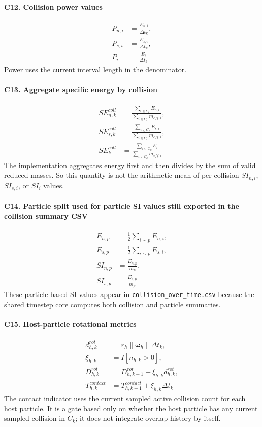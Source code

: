 \documentclass[11pt,a4paper]{article}
\newcommand{\code}[1]{\begingroup\urlstyle{tt}\footnotesize\nolinkurl{#1}\endgroup}
\begin{document}
\paragraph{C12. Collision power values}
\[
\begin{aligned}
P_{n,i} &= \frac{E_{n,i}}{\Delta t_k}, \\
P_{s,i} &= \frac{E_{s,i}}{\Delta t_k}, \\
P_i &= \frac{E_i}{\Delta t_k}
\end{aligned}
\]
Power uses the current interval length in the denominator.

\paragraph{C13. Aggregate specific energy by collision}
\[
\begin{aligned}
SE_{n,k}^{coll} &= \frac{\sum_{i \in C_k} E_{n,i}}{\sum_{i \in C_k} m_{eff,i}}, \\
SE_{s,k}^{coll} &= \frac{\sum_{i \in C_k} E_{s,i}}{\sum_{i \in C_k} m_{eff,i}}, \\
SE_k^{coll} &= \frac{\sum_{i \in C_k} E_i}{\sum_{i \in C_k} m_{eff,i}}
\end{aligned}
\]
The implementation aggregates energy first and then divides by the sum of valid reduced masses.
So this quantity is not the arithmetic mean of per-collision $SI_{n,i}$, $SI_{s,i}$, or $SI_i$ values.

\paragraph{C14. Particle split used for particle SI values still exported in the collision summary CSV}
\[
\begin{aligned}
E_{n,p} &= \frac{1}{2}\sum_{i \sim p} E_{n,i}, \\
E_{s,p} &= \frac{1}{2}\sum_{i \sim p} E_{s,i}, \\
SI_{n,p} &= \frac{E_{n,p}}{m_p}, \\
SI_{s,p} &= \frac{E_{s,p}}{m_p}
\end{aligned}
\]
These particle-based SI values appear in \code{collision_over_time.csv} because the shared timestep core computes both collision and particle summaries.

\paragraph{C15. Host-particle rotational metrics}
\[
\begin{aligned}
d_{h,k}^{rot} &= r_h \|\boldsymbol{\omega}_h\| \Delta t_k, \\
\xi_{h,k} &= I[n_{h,k} > 0], \\
D_{h,k}^{rot} &= D_{h,k-1}^{rot} + \xi_{h,k} d_{h,k}^{rot}, \\
T_{h,k}^{contact} &= T_{h,k-1}^{contact} + \xi_{h,k}\Delta t_k
\end{aligned}
\]
The contact indicator uses the current sampled active collision count for each host particle.
It is a gate based only on whether the host particle has any current sampled collision in $C_k$; it does not integrate overlap history by itself.
\end{document}
